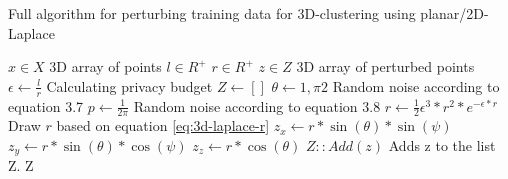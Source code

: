 \begin{algorithm}[H]
    \caption{Full algorithm for perturbing training data for 3D-clustering using planar/2D-Laplace \citep{DBLP:journals/corr/abs-1212-1984}}\label{alg:rq1}
    \begin{algorithmic}
      \Require $x \in X$  \Comment 3D array of points
      \Require $l \in R^ +$
      \Require $r \in R^ +$ 
      \Ensure $z \in Z$ \Comment 3D array of perturbed points
      \State $\epsilon \gets \frac{l}{r}$ \Comment Calculating privacy budget \citep{DBLP:journals/corr/abs-1212-1984}
      \State $Z \gets []$
        \State $\theta \gets {1, \pi2}$       \Comment Random noise according to equation 3.7
        \State $p \gets \frac{1}{2\pi}$     \Comment Random noise according to equation 3.8
        \State $r \gets \frac{1}{2}\epsilon^3 * r^2 * e^{-\epsilon * r}$          \Comment Draw $r$ based on equation \ref{eq:3d-laplace-r}
        \State $z_x \gets r * \sin(\theta) * \sin(\psi)$ 
        \State $z_y \gets r * \sin(\theta) * \cos(\psi)$
        \State $z_z \gets r * \cos(\theta)$
      \State $Z::Add(z)$                      \Comment Adds z to the list Z.
      \EndFor
      \State \Return Z
    \end{algorithmic}
    \label{alg:3d-laplace}
  \end{algorithm}